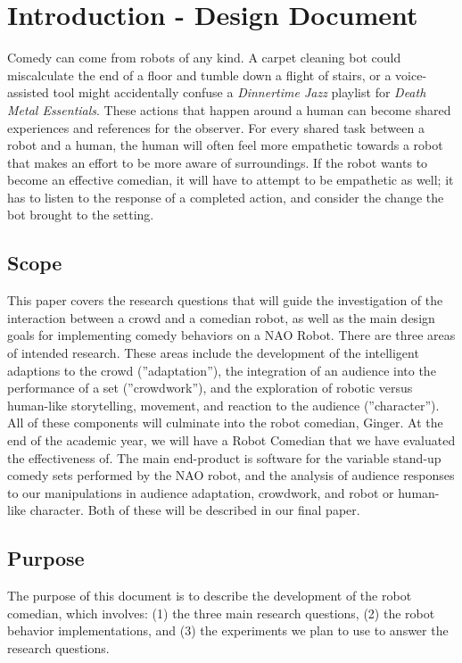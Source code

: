 \documentclass[onecolumn, draftclsnofoot,10pt, compsoc]{IEEEtran}
\begin{document}
\section{Introduction - Design Document}

  Comedy can come from robots of any kind. A carpet cleaning bot could miscalculate the end of a floor and tumble down a flight of stairs, or a voice-assisted tool might accidentally confuse a \textit{Dinnertime Jazz} playlist for \textit{Death Metal Essentials}. These actions that happen around a human can become shared experiences and references for the observer. For every shared task between a robot and a human, the human will often feel more empathetic towards a robot that makes an effort to be more aware of surroundings\cite{DesignExBeh:2017}. If the robot wants to become an effective comedian, it will have to attempt to be empathetic as well; it has to listen to the response of a completed action, and consider the change the bot brought to the setting.

\subsection{Scope}
This paper covers the research questions that will guide the investigation of the interaction between a crowd and
a comedian robot, as well as the main design goals for implementing comedy behaviors on a NAO Robot. There
are three areas of intended research. These areas include the development of the intelligent adaptions to the crowd
(”adaptation”), the integration of an audience into the performance of a set (”crowdwork”), and the exploration of
robotic versus human-like storytelling, movement, and reaction to the audience (”character”). All of these components
will culminate into the robot comedian, Ginger. At the end of the academic year, we will have a Robot Comedian that we
have evaluated the effectiveness of. The main end-product is software for the variable stand-up comedy sets performed
by the NAO robot, and the analysis of audience responses to our manipulations in audience adaptation, crowdwork,
and robot or human-like character. Both of these will be described in our final paper.


  \subsection{Purpose}
	The purpose of this document is to describe the development of the robot comedian, which involves: (1) the three
main research questions, (2) the robot behavior implementations, and (3) the experiments we plan to use to answer the
research questions.
\end{document}

